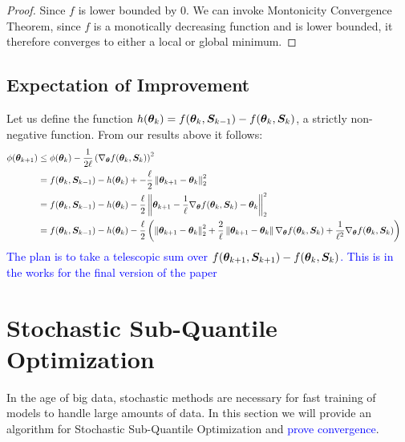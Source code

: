 \documentclass{article} %
\newcommand{\norm}[1]{\left\lVert#1\right\rVert}
\begin{document}
\begin{appendices}
\begin{proof}
	Since $f$ is lower bounded by $0$. We can invoke Montonicity Convergence Theorem, since $f$ is a monotically decreasing function and is lower bounded, it therefore converges to either a local or global minimum. 
	\end{proof}
	
	\subsection{Expectation of Improvement}
	Let us define the function $h({\bm{\theta}}_k) = f({\bm{\theta}}_k,{\bm{S}}_{k-1}) - f({\bm{\theta}}_k,{\bm{S}}_k)$, a strictly non-negative function. From our results above it follows:
	\begin{align*}
		\phi(\vtheta_{k+1}) &\leq \phi(\vtheta_k) - \frac{1}{2\ell}\left(\nabla_\vtheta f(\vtheta_k,\mS_k)\right)^2 &&\\
		&= f(\vtheta_k, \mS_{k-1}) - h(\vtheta_k) +  - \frac{\ell}{2}\norm{\vtheta_{k+1} - \vtheta_k}^2_2 \\
		&= f(\vtheta_k, \mS_{k-1}) - h(\vtheta_k) - \frac{\ell}{2}\norm{\vtheta_{k+1} - \frac{1}{\ell} \nabla_\vtheta f(\vtheta_k,\mS_k) - \vtheta_k}_2^2 &&\\
		&= f(\vtheta_k, \mS_{k-1}) - h(\vtheta_k) - \frac{\ell}{2}\left(\norm{\vtheta_{k+1}-\vtheta_k}_2^2 + \frac{2}{\ell}\norm{\vtheta_{k+1}-\vtheta_k}\nabla_\vtheta f(\vtheta_k,\mS_k) + \frac{1}{\ell^2}\nabla_\vtheta f(\vtheta_k,\mS_k)\right)
	\end{align*}
	\textcolor{blue}{The plan is to take a telescopic sum over $f({\bm{\theta}}_{k+1},{\bm{S}}_{k+1}) - f({\bm{\theta}}_k,{\bm{S}}_k)$. This is in the works for the final version of the paper}
	\newpage
	
	\section{Stochastic Sub-Quantile Optimization}
	In the age of big data, stochastic methods are necessary for fast training of models to handle large amounts of data. In this section we will provide an algorithm for Stochastic Sub-Quantile Optimization and \textcolor{blue}{prove convergence}.
	\begin{algorithm}[H]
		\DontPrintSemicolon
		

\end{algorithm}
\end{appendices}
\end{document}

